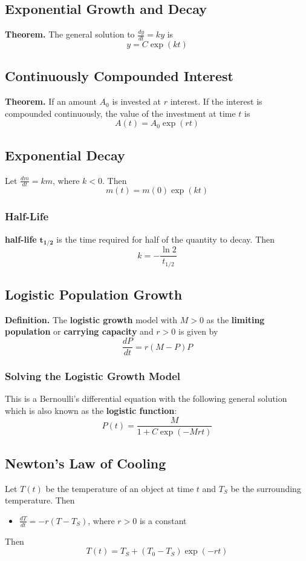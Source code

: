 \documentclass[../ma2002_notes.tex]{subfiles}
\begin{document}
\subsection{Exponential Growth and Decay}
\textbf{Theorem.} The general solution to \(\displaystyle\frac{dy}{dt}=ky\) is
\[y=C\exp(kt)\]

\subsection{Continuously Compounded Interest}
\textbf{Theorem.} If an amount \(A_0\) is invested at \(r\) interest. If the interest is compounded continuously, the value of the investment at time \(t\) is
\[A(t)=A_0\exp(rt)\]

\subsection{Exponential Decay}
Let \(\displaystyle\frac{dm}{dt}=km\), where \(k<0\). Then
\[m(t)=m(0)\exp(kt)\]

\subsubsection{Half-Life}
\textbf{half-life} \(\pmb{t_{1/2}}\) is the time required for half of the quantity to decay. Then
\[k=-\frac{\ln2}{t_{1/2}}\]

\subsection{Logistic Population Growth}
\textbf{Definition.} The \textbf{logistic growth} model with \(M>0\) as the \textbf{limiting population} or \textbf{carrying capacity} and \(r>0\) is given by
\[\frac{dP}{dt}=r(M-P)P\]

\subsubsection{Solving the Logistic Growth Model}
This is a Bernoulli's differential equation with the following general solution which is also known as the \textbf{logistic function}:
\[P(t)=\frac{M}{1+C\exp(-Mrt)}\]

\subsection{Newton's Law of Cooling}
Let \(T(t)\) be the temperature of an object at time \(t\) and \(T_S\) be the surrounding temperature. Then
\begin{itemize}
	\item\(\displaystyle\frac{dT}{dt}=-r(T-T_S)\), where \(r>0\) is a constant
\end{itemize}
Then
\[T(t)=T_S+(T_0-T_S)\exp(-rt)\]
\end{document}

